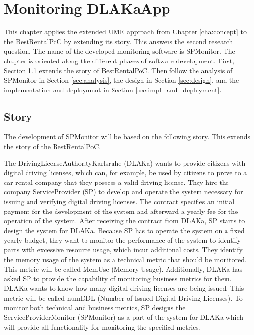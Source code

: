 \chapter{Monitoring DLAKaApp}
\label{cha:first_solution}

This chapter applies the extended UME approach from Chapter \ref{cha:concept}
to the BestRentalPoC by extending its story. This answers the second research question.
The name of the developed monitoring software is SPMonitor. The
chapter is oriented along the different phases of software development. First,
Section \ref{sec:story} extends the story of BestRentalPoC. Then follow
the analysis of SPMonitor in Section \ref{sec:analysis}, the design in Section
\ref{sec:design}, and the implementation and deployment in Section
\ref{sec:impl_and_deployment}.

\section{Story}
\label{sec:story}

The development of SPMonitor will be based on the following story.
This extends the story of the BestRentalPoC.

The DrivingLicenseAuthorityKarlsruhe (DLAKa) wants to provide citizens with
digital driving licenses, which can, for example, be used by citizens to prove
to a car rental company that they possess a valid driving license. They hire
the company ServiceProvider (SP) to develop and operate the system necessary
for issuing and verifying digital driving licenses. The contract specifies an
initial payment for the development of the system and afterward a yearly fee
for the operation of the system. After receiving the contract from DLAKa, SP
starts to design the system for DLAKa. Because SP has to operate the system on
a fixed yearly budget, they want to monitor the performance of the system to
identify parts with excessive resource usage, which incur additional costs.
They identify the memory usage of the system as a technical metric that should
be monitored. This metric will be called MemUse (Memory Usage). Additionally,
DLAKa has asked SP to provide the capability of monitoring business
metrics for them. DLAKa wants to know how many digital driving licenses
are being issued. This metric will be called numDDL (Number of Issued Digital
Driving Licenses). To monitor both technical and business metrics, SP designs
the ServiceProviderMonitor (SPMonitor) as a part of the system for DLAKa
which will provide all functionality for monitoring the specified metrics.

